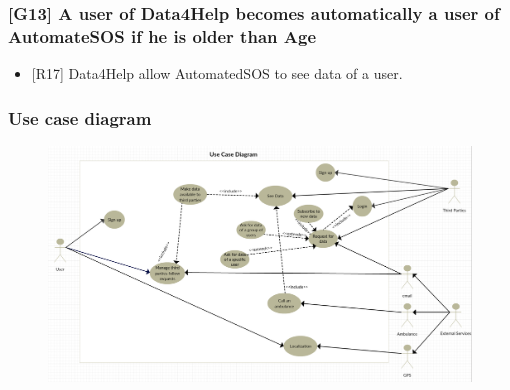 \documentclass{article}
\begin{document}
\subsubsection{[G13] A user of Data4Help becomes automatically a user of AutomateSOS if he is older than Age}
\begin{itemize}
\item {[R17]} Data4Help allow AutomatedSOS to see data of a user.
\end{itemize}\newpage
\subsubsection{Use case diagram}

\begin{figure}[h!]
\centering
    \textbf{}\par\medskip
	\includegraphics[width= \linewidth]{usecase.png}
\end{figure}
\end{document}

